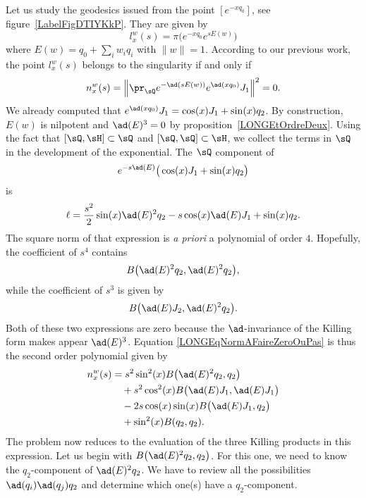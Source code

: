 Let us study the geodesics issued from the point $[ e^{-xq_0}]$, see figure~\ref{LabelFigDTIYKkP}. They are given by
\begin{equation}
    l^w_x(s)=\pi\big(    e^{-xq_0} e^{sE(w)} \big)
\end{equation}
where $E(w)=q_0+\sum_iw_iq_i$ with $\| w \|=1$. According to our previous work, the point $l^w_x(s)$ belongs to the singularity if and only if
\begin{equation}        \label{LONGEqNormAFaireZeroOuPas}
    n_x^w(s)=\left\|   \pr_{\sQ} e^{-\ad(sE(w))} e^{\ad(xq_0)}J_1  \right\|^2=0.
\end{equation}
%
We already computed that $ e^{\ad(xq_0)}J_1=\cos(x)J_1+\sin(x)q_2$. By construction, $E(w)$ is nilpotent and $\ad(E)^3=0$ by proposition~\ref{LONGEtOrdreDeux}. Using the fact that $[\sQ,\sH]\subset\sQ$ and $[\sQ,\sQ]\subset\sH$, we collect the terms in $\sQ$ in the development of the exponential. The $\sQ$ component of
\begin{equation}
    e^{-s\ad(E)}\big( \cos(x)J_1+\sin(x)q_2 \big)
\end{equation}
is
\begin{equation}
    \ell=\frac{ s^2 }{ 2 }\sin(x)\ad(E)^2q_2-s\cos(x)\ad(E)J_1+\sin(x)q_2.
\end{equation}
The square norm of that expression is \emph{a priori} a polynomial of order $4$. Hopefully, the coefficient of $s^4$ contains
\begin{equation}
    B\big( \ad(E)^2q_2,\ad(E)^2q_2 \big),
\end{equation}
while the coefficient of $s^3$ is given by
\begin{equation}
    B\big( \ad(E)J_2,\ad(E)^2q_2 \big).
\end{equation}
Both of these two expressions are zero because the $\ad$-invariance of the Killing form makes appear $\ad(E)^3$. Equation \eqref{LONGEqNormAFaireZeroOuPas} is thus the second order polynomial given by
%
%
\begin{equation}        \label{LONGEqnwxBBB}
    \begin{aligned}[]
        n_x^w(s)    &=s^2\sin^2(x)B\big( \ad(E)^2q_2,q_2 \big)\\
                &\quad+s^2\cos^2(x)B\big( \ad(E)J_1,\ad(E) J_1\big)\\
                &\quad-2s\cos(x)\sin(x)B\big( \ad(E)J_1,q_2 \big)\\
                &\quad+\sin^2(x)B(q_2,q_2).
    \end{aligned}
\end{equation}
The problem now reduces to the evaluation of the three Killing products in this expression. %
%
Let us begin with $B\big( \ad(E)^2q_2,q_2 \big)$. For this one, we need to know the $q_2$-component of $\ad(E)^2q_2$. We have to review all the possibilities $\ad(q_i)\ad(q_j)q_2$ and determine which one(s) have a $q_2$-component.

